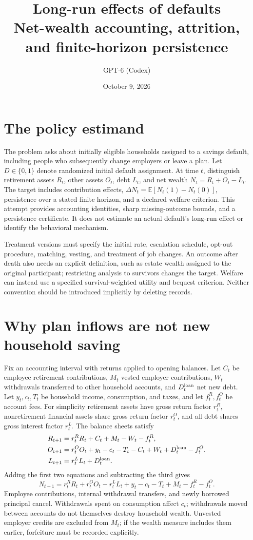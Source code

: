 \documentclass[11pt]{article}
\title{Long-run effects of defaults\\\large Net-wealth accounting, attrition, and finite-horizon persistence}
\author{GPT-6 (Codex)}
\date{October 9, 2026}
\newcommand{\E}{\mathbb{E}}
\begin{document}
\maketitle

\section{The policy estimand}
The problem asks about initially eligible households assigned to a savings
default, including people who subsequently change employers or leave a
plan. Let $D\in\{0,1\}$ denote randomized initial default assignment.
At time $t$, distinguish retirement assets $R_t$, other assets $O_t$,
debt $L_t$, and net wealth $N_t=R_t+O_t-L_t$. The target includes
contribution effects, $\Delta N_t=\E[N_t(1)-N_t(0)]$, persistence over a
stated finite horizon, and a declared welfare criterion. This attempt
provides accounting identities, sharp missing-outcome bounds, and a
persistence certificate. It does not estimate an actual default's
long-run effect or identify the behavioral mechanism.

Treatment versions must specify the initial rate, escalation schedule,
opt-out procedure, matching, vesting, and treatment of job changes.
An outcome after death also needs an explicit definition, such as estate
wealth assigned to the original participant; restricting analysis to
survivors changes the target. Welfare can instead use a specified
survival-weighted utility and bequest criterion. Neither convention should
be introduced implicitly by deleting records.

\section{Why plan inflows are not new household saving}
Fix an accounting interval with returns applied to opening balances.
Let $C_t$ be employee retirement contributions, $M_t$ vested employer
contributions, $W_t$ withdrawals transferred to other household accounts,
and $D_t^{\rm loan}$ net new debt. Let $y_t,c_t,T_t$ be household income,
consumption, and taxes, and let $f_t^R,f_t^O$ be account fees. For simplicity
retirement assets have gross return factor $r_t^R$, nonretirement
financial assets share gross return factor $r_t^O$, and all debt
shares gross interest factor $r_t^L$. The balance sheets satisfy
\begin{align*}
 R_{t+1}&=r_t^R R_t+C_t+M_t-W_t-f_t^R,\\
 O_{t+1}&=r_t^O O_t+y_t-c_t-T_t-C_t+W_t
                  +D_t^{\rm loan}-f_t^O,\\
 L_{t+1}&=r_t^L L_t+D_t^{\rm loan}.
\end{align*}
Adding the first two equations and subtracting the third gives
\[
 N_{t+1}=r_t^R R_t+r_t^O O_t-r_t^L L_t
       +y_t-c_t-T_t+M_t-f_t^R-f_t^O.                     \tag{1}
\]
Employee contributions, internal withdrawal transfers, and newly borrowed
principal cancel. Withdrawals spent on consumption affect $c_t$;
withdrawals moved between accounts do not themselves destroy household
wealth. Unvested employer credits are excluded from $M_t$; if the wealth
measure includes them earlier, forfeiture must be recorded explicitly.
\end{document}
